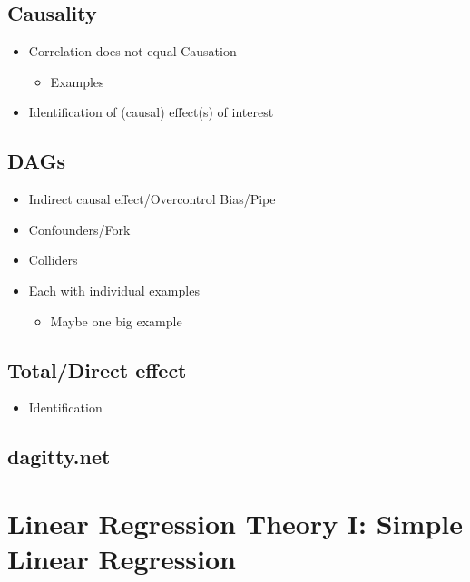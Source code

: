 \documentclass[
]{book}
\providecommand{\tightlist}{%
  \setlength{\itemsep}{0pt}\setlength{\parskip}{0pt}}
\begin{document}
\hypertarget{causality}{%
\section{Causality}\label{causality}}

\begin{itemize}
\tightlist
\item
  Correlation does not equal Causation

  \begin{itemize}
  \tightlist
  \item
    Examples
  \end{itemize}
\item
  Identification of (causal) effect(s) of interest
\end{itemize}

\hypertarget{dags}{%
\section{DAGs}\label{dags}}

\begin{itemize}
\tightlist
\item
  Indirect causal effect/Overcontrol Bias/Pipe
\item
  Confounders/Fork
\item
  Colliders
\item
  Each with individual examples

  \begin{itemize}
  \tightlist
  \item
    Maybe one big example
  \end{itemize}
\end{itemize}

\hypertarget{totaldirect-effect}{%
\section{Total/Direct effect}\label{totaldirect-effect}}

\begin{itemize}
\tightlist
\item
  Identification
\end{itemize}

\hypertarget{dagitty.net}{%
\section{dagitty.net}\label{dagitty.net}}

\hypertarget{lin-t-1}{%
\chapter{Linear Regression Theory I: Simple Linear Regression}\label{lin-t-1}}
\end{document}
